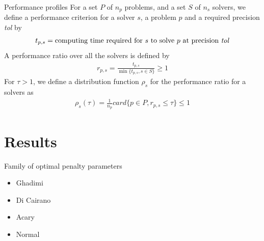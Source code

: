 \documentclass[8pt,red]{beamer}
\theoremstyle{plain}
\theoremstyle{definition}
\theoremstyle{remark}
\begin{document}
\begin{frame}{Performance profiles}
For a set $P$ of $n_{p}$ problems, and a set $S$ of $n_{s}$ solvers, we define a performance criterion for a solver $s$, a problem $p$ and a required precision \textit{tol} by
\begin{align}
	t_{p,s} = \text{computing time required for } s \text{ to solve } p \text{ at precision \textit{tol}}
\end{align}
A performance ratio over all the solvers is defined by
\begin{align}
	r_{p,s} = \frac{t_{p,s}}{\min \lbrace t_{p,s}, s \in S \rbrace} \geq 1
\end{align}
For $\tau > 1$, we define a distribution function $\rho_{s}$ for the performance ratio for a solvers as
\begin{align}
	\rho_{s}(\tau) = \frac{1}{n_{p}} card \lbrace p \in P, r_{p,s} \leq \tau \rbrace \leq 1
\end{align}
\end{frame}

\section{Results}
\begin{frame}
Family of optimal penalty parameters
\begin{itemize}
\item Ghadimi
\item Di Cairano
\item Acary
\item Normal
\end{itemize}
\end{frame}
\end{document}
